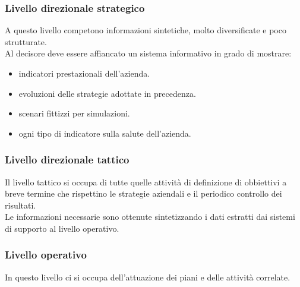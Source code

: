 \documentclass{book}
\begin{document}
    \subsubsection{Livello direzionale strategico}
    A questo livello competono informazioni sintetiche, molto diversificate e poco strutturate.\\
    Al decisore deve essere affiancato un sistema informativo in grado di mostrare:
    \begin{itemize}
        \item indicatori prestazionali dell'azienda.
        \item evoluzioni delle strategie adottate in precedenza.
        \item scenari fittizzi per simulazioni.
        \item ogni tipo di indicatore sulla salute dell'azienda.
    \end{itemize}

    \subsubsection{Livello direzionale tattico}
    Il livello tattico si occupa di tutte quelle attività di definizione di obbiettivi a breve termine che rispettino le strategie aziendali e il periodico controllo dei risultati.\\
    Le informazioni necessarie sono ottenute sintetizzando i dati estratti dai sistemi di supporto al livello operativo.

    \subsubsection{Livello operativo}
    In questo livello ci si occupa dell'attuazione dei piani e delle attività correlate.
\end{document}
